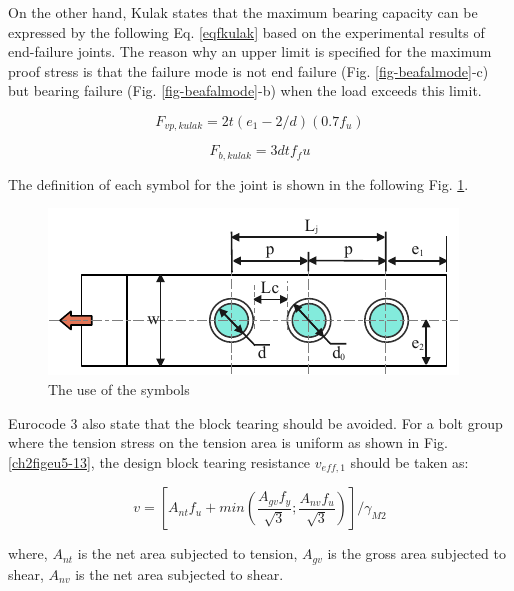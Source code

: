 On the other hand, Kulak \cite{Kulak1988guide} states that the maximum bearing capacity can be expressed by the following Eq. \ref{eqfkulak} based on the experimental results of end-failure joints. The reason why an upper limit is specified for the maximum proof stress is that the failure mode is not end failure (Fig. \ref{fig-beafalmode}-c) but bearing failure (Fig. \ref{fig-beafalmode}-b) when the load exceeds this limit.

\begin{equation}\label{eqfkulak}
    F_{vp,kulak}=2t(e_1-2/d)(0.7f_u)
\end{equation}

\begin{equation}
    F_{b,kulak}=3dtf_fu
\end{equation}

The definition of each symbol for the joint is shown in the following Fig. \ref{fig-symbol}.

\begin{figure}[htbp]
    \centering
    \includegraphics[width=0.7\linewidth]{imgs//ch2/symbol.pdf}
    \caption{The use of the symbols}
    \label{fig-symbol}
\end{figure}

Eurocode 3 also state that the block tearing should be avoided. For a bolt group where the tension stress on the tension area is uniform as shown in Fig. \ref{ch2figeu5-13}, the design block tearing resistance $v_{eff,1}$ should be taken as:

\begin{equation}
    v=[A_{nt}f_u+min(\frac{A_{gv}f_y}{\sqrt{3}}; \frac{A_{nv}f_u}{\sqrt{3}})]/\gamma_{M2}
\end{equation}

where, $A_{nt}$ is the net area subjected to tension, $A_{gv}$ is the gross area subjected to shear, $A_{nv}$ is the net area subjected to shear.

